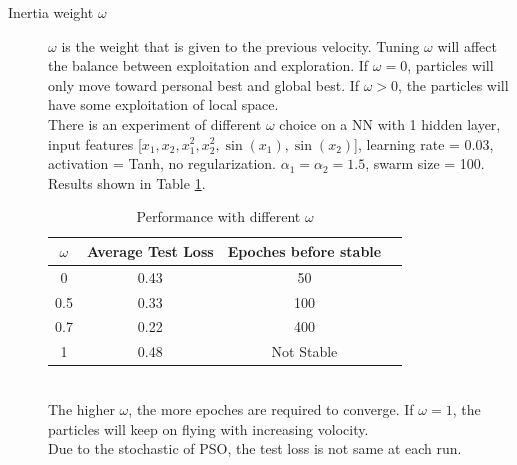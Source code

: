 \documentclass[12pt]{article}
\begin{document}
\begin{description}
\item[Inertia weight $\omega$]  $\omega$ is the weight that is given to the previous velocity. Tuning $\omega$ will affect the balance between exploitation and exploration. If $\omega = 0$, particles will only move toward personal best and global best. If $\omega > 0$, the particles will have some exploitation of local space. \\
There is an experiment of different $\omega$ choice on a NN with 1 hidden layer, input features [$x_1,x_2,x_1^2,x_2^2,\sin(x_1),\sin(x_2)$], learning rate = 0.03, activation = Tanh, no regularization. $\alpha_1=\alpha_2 = 1.5$, swarm size = 100.
Results shown in Table \ref{t_omega}.
\begin{table}[h]
\centering
\begin{tabular}{@{}cccc@{}}
\toprule
$\omega$ & Average Test Loss & Epoches before stable \\ \midrule
0 & 0.43 & 50  \\
0.5 & 0.33  &  100  \\
0.7 & 0.22  &   400 \\
1  & 0.48  & Not Stable  \\
\bottomrule
\end{tabular}
\caption{Performance with different $\omega$}
\label{t_omega}
\end{table}
\\
The higher $\omega$, the more epoches are required to converge. If $\omega = 1$, the particles will keep on flying with increasing volocity.\\
Due to the stochastic of PSO, the test loss is not same at each run. 
\end{description}
\end{document}
